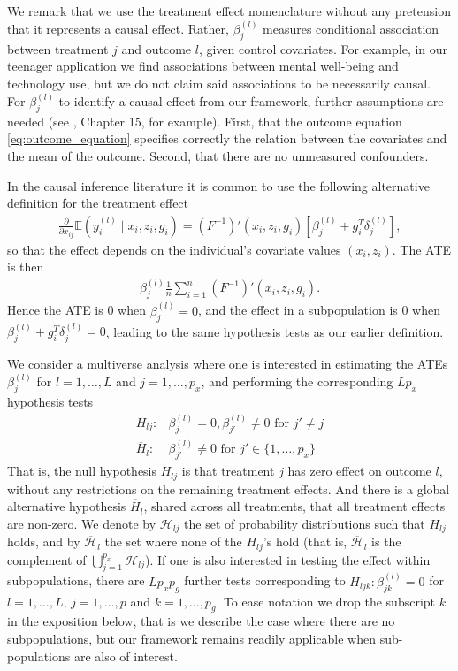 \documentclass[pdflatex,sn-mathphys-num]{sn-jnl}%
\theoremstyle{thmstyleone}%
\theoremstyle{thmstyletwo}%
\theoremstyle{thmstylethree}%
\begin{document}
\color{blue} 
We remark that we use the treatment effect nomenclature without any pretension that it represents a causal effect. Rather, $\beta_j^{(l)}$ measures conditional association between treatment $j$ and outcome $l$, given control covariates. For example, in our teenager application we find associations between mental well-being and technology use, but we do not claim said associations to be necessarily causal. For $\beta_j^{(l)}$ to identify a causal effect from our framework, further assumptions are needed (see \cite{hernan:2010}, Chapter 15, for example). First, that the outcome equation \eqref{eq:outcome_equation} specifies correctly the relation between the covariates and the mean of the outcome. Second, that there are no unmeasured confounders.

In the causal inference literature it is common to use the following alternative definition for the treatment effect
\begin{align}
 \frac{\partial}{\partial x_{ij}} \mathbb E (y_i^{(l)} \mid x_i, z_i, g_i)
= (F^{-1})' (x_i, z_i, g_i) [ \beta_j^{(l)} + g_i^T \delta_j^{(l)} ],
\nonumber
\end{align}
so that the effect depends on the individual's covariate values $(x_i, z_i)$. The ATE is then
\begin{align}
\beta_j^{(l)} \frac{1}{n} \sum_{i=1}^n (F^{-1})' (x_i, z_i, g_i).
\nonumber
\end{align}
Hence the ATE is 0 when $\beta_j^{(l)}=0$, and the effect in a subpopulation is 0 when $\beta_j^{(l)} + g_i^T \delta_j^{(l)}=0$,
leading to the same hypothesis tests as our earlier definition.
\color{black}

We consider a multiverse analysis where one is interested in estimating the ATEs $\beta_j^{(l)}$ for $l=1,\ldots,L$ and $j=1,\ldots,p_x$,
and performing the corresponding $L p_x$ hypothesis tests
\begin{align}\label{eq:test}
H_{lj}: &\beta_j^{(l)}= 0, \beta_{j'}^{(l)} \neq 0 \mbox{ for } j' \neq j
\nonumber
\\
\overline{H}_l: & \beta_{j'}^{(l)} \neq 0 \mbox{ for } j' \in \{1,\ldots,p_x\}
\end{align}
That is, the null hypothesis $H_{lj}$ is that treatment $j$ has zero effect on outcome $l$, without any restrictions on the remaining treatment effects.
And there is a global alternative hypothesis $\overline{H}_l$, shared across all treatments, that all treatment effects are non-zero.
We denote by $\mathcal{H}_{lj}$ the set of probability distributions such that $H_{lj}$ holds, and by $\overline{\mathcal{H}}_l$ the set where \color{blue} none of the $H_{lj}$'s hold (that is, $\overline{\mathcal{H}}_l$ is the complement of $\bigcup_{j=1}^{p_x} \mathcal{H}_{lj}$). \color{black}
If one is also interested in testing the effect within subpopulations, there are $L p_x p_g$ further tests corresponding to $H_{ljk}: \beta_{jk}^{(l)}=0$ for  $l=1,\ldots,L$, $j=1,\ldots,p$ and $k=1,\ldots,p_g$.
To ease notation we drop the subscript $k$ in the exposition below, that is we describe the case where there are no subpopulations, but our framework remains readily applicable when sub-populations are also of interest.
\end{document}
